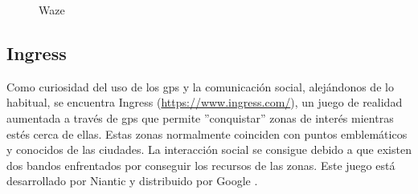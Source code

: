 \begin{figure}[h!btp]
	\begin{adjustbox}{minipage=\linewidth, fbox}
		\centering
		\hspace{10mm}
	\end{adjustbox}
\caption{Waze}
	\label{fig:waze}
\end{figure}

\subsection{Ingress}

Como curiosidad del uso de los gps y la comunicación social, alejándonos de lo habitual, se encuentra Ingress (\url{https://www.ingress.com/}), un juego de realidad aumentada a través de gps que permite ''conquistar'' zonas de interés mientras estés cerca de ellas. Estas zonas normalmente coinciden con puntos emblemáticos y conocidos de las ciudades. La interacción social se consigue debido a que existen dos bandos enfrentados por conseguir los recursos de las zonas. Este juego está desarrollado por Niantic y distribuido por Google \cite{Pen13}.

